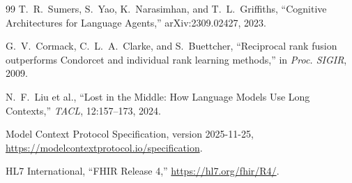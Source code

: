 \documentclass[11pt,a4paper]{article}
\begin{document}
\begin{thebibliography}{99}
 T.~R.~Sumers, S.~Yao, K.~Narasimhan, and T.~L.~Griffiths, ``Cognitive Architectures for Language Agents,'' arXiv:2309.02427, 2023.

 G.~V.~Cormack, C.~L.~A.~Clarke, and S.~Buettcher, ``Reciprocal rank fusion outperforms Condorcet and individual rank learning methods,'' in \emph{Proc. SIGIR}, 2009.

 N.~F.~Liu et al., ``Lost in the Middle: How Language Models Use Long Contexts,'' \emph{TACL}, 12:157--173, 2024.

 Model Context Protocol Specification, version 2025-11-25, \url{https://modelcontextprotocol.io/specification}.

 HL7 International, ``FHIR Release 4,'' \url{https://hl7.org/fhir/R4/}.

\end{thebibliography}
\endgroup
\end{document}
